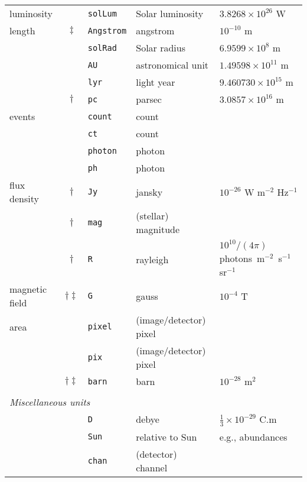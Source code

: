 \documentclass[11pt,makeidx]{book}     %
\begin{document}
\begin{table*}[tbp]
\begin{center}
\begin{tabular}{lclll}
luminosity     &      & \verb+solLum+   & Solar luminosity
                      & $3.8268\times10^{26}$ W \\
length         &$\ddag$& \verb+Angstrom+ & angstrom 
                      & $10^{-10}$ m \\
               &      & \verb+solRad+   & Solar radius
                      & $6.9599\times10^8$ m \\
               &      & \verb+AU+       & astronomical unit 
                      & $1.49598\times10^{11}$ m \\
               &      & \verb+lyr+      & light year
                      & $9.460730\times10^{15}$ m \\
               &$\dag$& \verb+pc+& parsec
                      & $3.0857\times10^{16}$ m \\
events         &      & \verb+count+ & count  & \\
               &      & \verb+ct+    & count  & \\
               &      & \verb+photon+ & photon  & \\
               &      & \verb+ph+     & photon  & \\
flux density   &$\dag$& \verb+Jy+   & jansky
                      & $10^{-26}$ W m$^{-2}$ Hz$^{-1}$ \\
               &$\dag$& \verb+mag+   & (stellar) magnitude &  \\
               &$\dag$& \verb+R+     & rayleigh & $10^{10}/(4\pi)$ photons\, m$^{-2}$\, s$^{-1}$\, sr$^{-1}$ \\
magnetic field &$\dag\ddag$& \verb+G+     & gauss
                      & $10^{-4}$ T \\
area           &      & \verb+pixel+ & (image/detector) pixel & \\
               &      & \verb+pix+   & (image/detector) pixel & \\
               &$\dag\ddag$& \verb+barn+  & barn
                      & $10^{-28}$ m$^{2}$ \\
& & & & \\
\multicolumn{5}{l}{\it Miscellaneous units\rule[-2mm]{0mm}{5mm}}\\
               &      & \verb+D+     & debye
                      & $\frac{1}{3}\times 10^{-29}$ C.m \\
               &      & \verb+Sun+   & relative to Sun
                      & e.g., abundances \\
               &      & \verb+chan+  & (detector) channel & \\

\end{tabular}
\end{center}
\end{table*}
\end{document}
